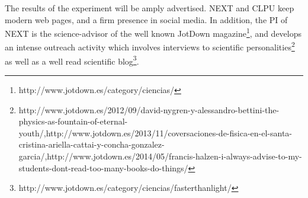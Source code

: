 The results of the experiment will be amply advertised. NEXT and CLPU keep modern web pages, and a firm presence in social media. In addition, the PI of NEXT is the science-advisor of the well known JotDown magazine\footnote{http://www.jotdown.es/category/ciencias/}, and develops an intense outreach activity which involves interviews to scientific personalities\footnote{http://www.jotdown.es/2012/09/david-nygren-y-alessandro-bettini-the-physics-as-fountain-of-eternal-youth/,http://www.jotdown.es/2013/11/coversaciones-de-fisica-en-el-santa-cristina-ariella-cattai-y-concha-gonzalez-garcia/,http://www.jotdown.es/2014/05/francis-halzen-i-always-advise-to-my-students-dont-read-too-many-books-do-things/} as well as a well read scientific blog\footnote{http://www.jotdown.es/category/ciencias/fasterthanlight/}.

